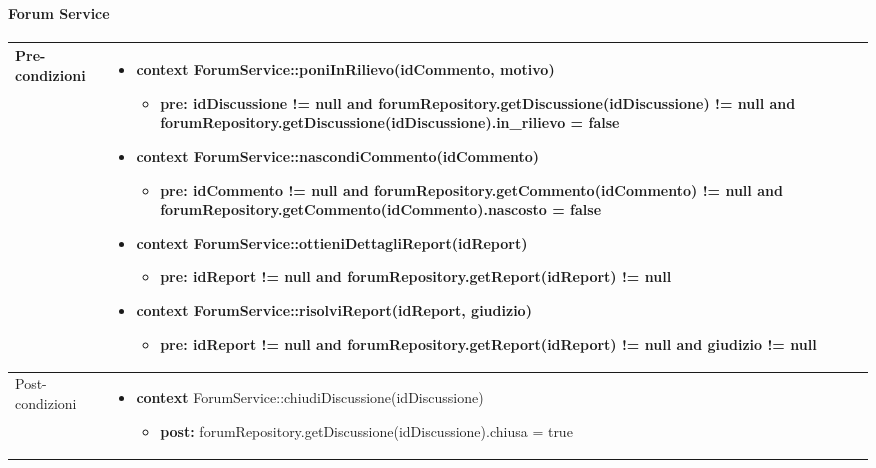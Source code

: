 \paragraph{Forum Service}
\small\begin{tabular}{|| l | p{28em} ||} 
	\hline
	Pre-condizioni & \begin{itemize}[leftmargin=*]
		\item \textbf{context} ForumService::poniInRilievo(idCommento, motivo)
		\begin{itemize}
			\item[ ] \textbf{pre:} idDiscussione != null and forumRepository.getDiscussione(idDiscussione) != null and forumRepository.getDiscussione(idDiscussione).in\_rilievo = false
		\end{itemize}

		\item \textbf{context} ForumService::nascondiCommento(idCommento)
		\begin{itemize}
			\item[ ] \textbf{pre:} idCommento != null and forumRepository.getCommento(idCommento) != null and forumRepository.getCommento(idCommento).nascosto = false
		\end{itemize}

		\item \textbf{context} ForumService::ottieniDettagliReport(idReport)
		\begin{itemize}
			\item[ ] \textbf{pre:} idReport != null and forumRepository.getReport(idReport) != null
		\end{itemize}

		\item \textbf{context} ForumService::risolviReport(idReport, giudizio)
		\begin{itemize}
			\item[ ] \textbf{pre:} idReport != null and forumRepository.getReport(idReport) != null and giudizio != null
		\end{itemize}
	\end{itemize}\\
	\hline
	Post-condizioni & \begin{itemize}[leftmargin=*]
		\item \textbf{context} ForumService::chiudiDiscussione(idDiscussione)
		\begin{itemize}
			\item[ ] \textbf{post:} forumRepository.getDiscussione(idDiscussione).chiusa = true
		\end{itemize}


\end{itemize}
\end{tabular}
